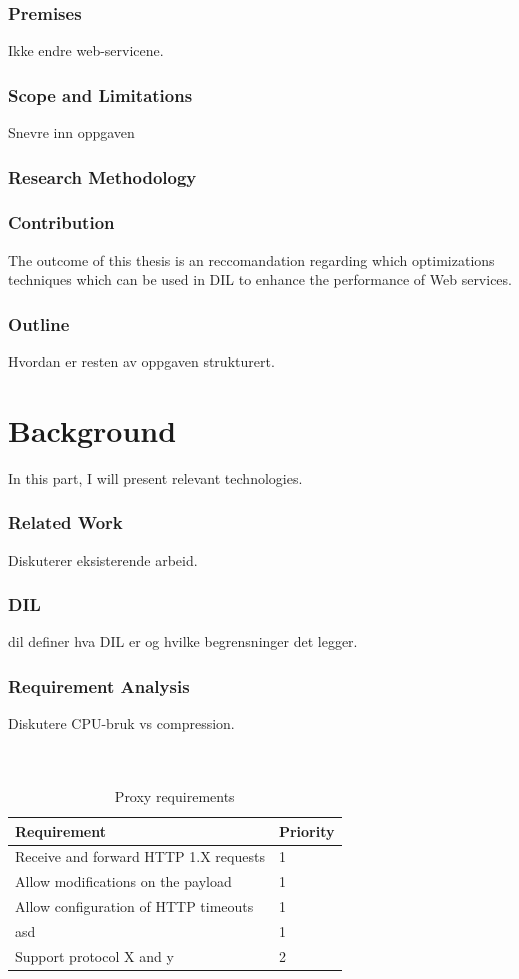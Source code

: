 \documentclass[USenglish]{article}
\begin{document}
\section{Premises}
Ikke endre web-servicene.

\section{Scope and Limitations}
Snevre inn oppgaven

\section{Research Methodology}

\section{Contribution}
The outcome of this thesis is an reccomandation regarding which optimizations techniques which can be used in DIL to enhance the performance of Web services.

\section{Outline}
Hvordan er resten av oppgaven strukturert.


\part{Background}
In this part, I will present relevant technologies.
\section{Related Work}
Diskuterer eksisterende arbeid.
\section{DIL}
\gls{dil} definer hva DIL er og hvilke begrensninger det legger.

\section{Requirement Analysis}
Diskutere CPU-bruk vs compression.
\\ \\ \\
\begin{table}
\begin{tabular}{| l | l |}
\hline
  \textbf{Requirement} & \textbf{Priority} \\ \hline
  Receive and forward HTTP 1.X requests & 1\\ \hline
  Allow modifications on the payload & 1 \\ \hline
  Allow configuration of HTTP timeouts & 1 \\ \hline
  asd & 1 \\ \hline
  Support protocol X and y & 2 \\ \hline
\end{tabular}
\caption{Proxy requirements}
\end{table}
\end{document}
